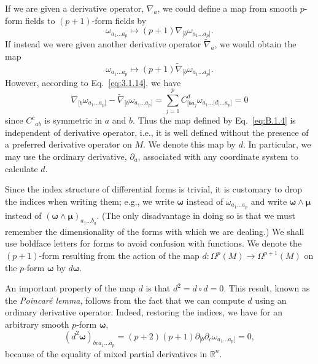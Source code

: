 If we are given a derivative operator, \(\nabla_a\), we could define a map from smooth
\(p\)-form fields to \((p+1)\)-form fields by
\begin{equation}
  \omega_{a_1\ldots a_p}\longmapsto
  (p+1)\nabla_{[b}\omega_{a_1\ldots a_p]}.
  \tag{B.1.4}\label{eq:B.1.4}
\end{equation}
If instead we were given another derivative operator \(\widetilde\nabla_a\), we would
obtain the map
\begin{equation}
  \omega_{a_1\ldots a_p}\longmapsto
  (p+1)\widetilde\nabla_{[b}\omega_{a_1\ldots a_p]}.
  \tag{B.1.5}\label{eq:B.1.5}
\end{equation}
However, according to Eq.~\eqref{eq:3.1.14}, we have
\begin{equation}
  \nabla_{[b}\omega_{a_1\ldots a_p]}
  -\widetilde\nabla_{[b}\omega_{a_1\ldots a_p]}
  =\sum_{j=1}^{p}C^d_{[ba_j}
  \omega_{a_1\ldots\lvert d\rvert\ldots a_p]}=0
  \tag{B.1.6}\label{eq:B.1.6}
\end{equation}
since \(C^c{}_{ab}\) is symmetric in \(a\) and \(b\). Thus the map defined by
Eq.~\eqref{eq:B.1.4} is independent of derivative operator, i.e., it is well defined
without the presence of a preferred derivative operator on \(M\). We denote this map
by \(d\). In particular, we may use the ordinary derivative, \(\partial_a\), associated
with any coordinate system to calculate \(d\).

Since the index structure of differential forms is trivial, it is customary to drop the
indices when writing them; e.g., we write \(\boldsymbol\omega\) instead of
\(\omega_{a_1\ldots a_p}\) and write \(\boldsymbol\omega\wedge\boldsymbol\mu\)
instead of \((\boldsymbol\omega\wedge\boldsymbol\mu)_{a_1\ldots b_q}\). (The only
disadvantage in doing so is that we must remember the dimensionality of the forms
with which we are dealing.) We shall use boldface letters for forms to avoid
confusion with functions. We denote the \((p+1)\)-form resulting from the action of
the map \(d:\Omega^p(M)\to\Omega^{p+1}(M)\) on the \(p\)-form
\(\boldsymbol\omega\) by \(d\boldsymbol\omega\).

An important property of the map \(d\) is that \(d^2=d\circ d=0\). This result,
known as the \emph{Poincar\'e lemma}, follows from the fact that we can compute \(d\)
using an ordinary derivative operator. Indeed, restoring the indices, we have for an
arbitrary smooth \(p\)-form \(\boldsymbol\omega\),
\begin{equation}
  (d^2\boldsymbol\omega)_{bca_1\ldots a_p}
  =(p+2)(p+1)\partial_{[b}\partial_c\omega_{a_1\ldots a_p]}=0,
  \tag{B.1.7}\label{eq:B.1.7}
\end{equation}
because of the equality of mixed partial derivatives in \(\mathbb R^n\).

